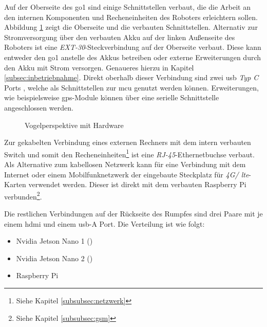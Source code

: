 Auf der Oberseite des \gls{go1} sind einige Schnittstellen verbaut, die die Arbeit an den internen Komponenten und
Recheneinheiten des Roboters erleichtern sollen.
Abbildung \ref{fig:vogelperspektive} zeigt die Oberseite und die verbauten Schnittstellen.
Alternativ zur Stromversorgung über den verbauten Akku  auf der linken Außenseite des Roboters ist eine
\emph{EXT-30}-Steckverbindung  auf der Oberseite verbaut.
Diese kann entweder den \gls{go1} anstelle des Akkus betreiben oder externe Erweiterungen durch den Akku mit Strom versorgen.
Genaueres hierzu in Kapitel \ref{subsec:inbetriebnahme}.
Direkt oberhalb dieser Verbindung sind zwei \gls{usb} \emph{Typ C} Ports , welche als Schnittstellen zur \gls{mcu} genutzt werden können.
Erweiterungen, wie beispielsweise \gls{gps}-Module können über eine serielle Schnittstelle  angeschlossen werden.

\begin{figure}[h]
    \caption{Vogelperspektive mit Hardware}\label{fig:vogelperspektive}
\end{figure}

Zur gekabelten Verbindung eines externen Rechners mit dem intern verbauten Switch und somit den Recheneinheiten\footnote{Siehe Kapitel \ref{subsubsec:netzwerk}}
ist eine \emph{RJ-45}-Ethernetbuchse  verbaut.
Als Alternative zum kabellosen Netzwerk kann für eine Verbindung mit dem Internet oder einem Mobilfunknetzwerk der eingebaute
Steckplatz für \emph{4G/ \gls{lte}}-Karten  verwendet werden.
Dieser ist direkt mit dem verbauten Raspberry Pi verbunden\footnote{Siehe Kapitel \ref{subsubsec:gsm}}.

Die restlichen Verbindungen auf der Rückseite des Rumpfes sind drei Paare mit je einem \gls{hdmi} und einem \gls{usb}-A Port.
Die Verteilung ist wie folgt:

\begin{itemize}
    \item {} Nvidia Jetson Nano 1 ()
    \item {} Nvidia Jetson Nano 2 ()
    \item {} Raspberry Pi
\end{itemize}





